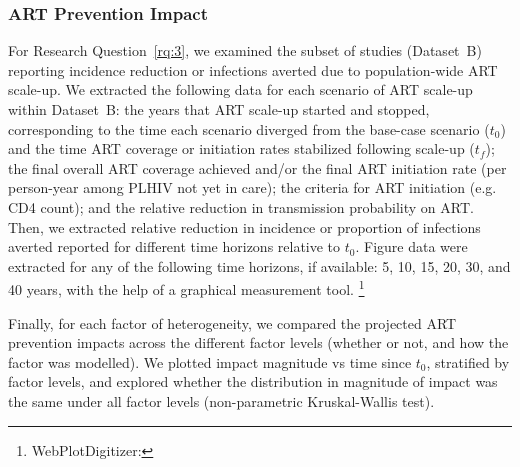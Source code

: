 \subsubsection{ART Prevention Impact}
\label{sss:meth:api}
For Research Question~\ref{rq:3}, we examined the subset of studies (Dataset~B)
reporting incidence reduction or infections averted due to
population-wide ART scale-up.
We extracted the following data for each scenario of ART scale-up within Dataset~B:
the years that ART scale-up started and stopped, corresponding to
the time each scenario diverged from the base-case scenario ($t_0$) and
the time ART coverage or initiation rates stabilized following scale-up ($t_f$);
the final overall ART coverage achieved and/or
the final ART initiation rate (per person-year among PLHIV not yet in care);
the criteria for ART initiation (e.g. CD4 count);
and the relative reduction in transmission probability on ART.
Then, we extracted relative reduction in incidence or proportion of infections averted
reported for different time horizons relative to $t_0$.
Figure data were extracted for any of the following time horizons, if available:
5, 10, 15, 20, 30, and 40 years,
with the help of a graphical measurement tool.%
\footnote{WebPlotDigitizer: }
\par
Finally, for each factor of heterogeneity,
we compared the projected ART prevention impacts across
the different factor levels (whether or not, and how the factor was modelled).
We plotted impact magnitude vs time since $t_0$, stratified by factor levels,
and explored whether the distribution in magnitude of impact
was the same under all factor levels (non-parametric Kruskal-Wallis test).